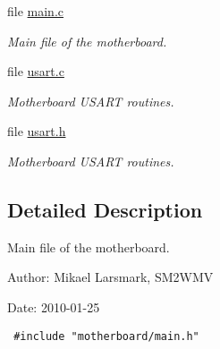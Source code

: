 \begin{CompactItemize}
\item 
file \hyperlink{motherboard_2main_8c}{main.c}
\begin{CompactList}\small\item\em Main file of the motherboard. \item\end{CompactList}

\item 
file \hyperlink{motherboard_2usart_8c}{usart.c}
\begin{CompactList}\small\item\em Motherboard USART routines. \item\end{CompactList}

\item 
file \hyperlink{motherboard_2usart_8h}{usart.h}
\begin{CompactList}\small\item\em Motherboard USART routines. \item\end{CompactList}

\end{CompactItemize}


\subsection{Detailed Description}
Main file of the motherboard. 

\begin{Desc}
\item[Author:]Mikael Larsmark, SM2WMV \end{Desc}
\begin{Desc}
\item[Date:]2010-01-25 

\begin{Code}\begin{verbatim} #include "motherboard/main.h" 
\end{verbatim}
\end{Code}

 \end{Desc}
